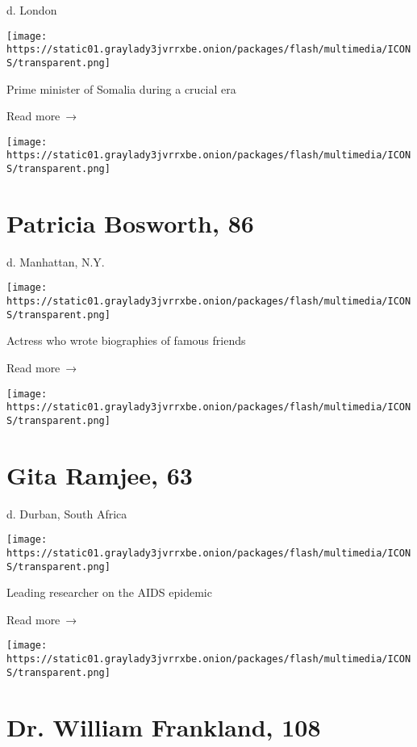 d. London

\texttt{[image: https://static01.graylady3jvrrxbe.onion/packages/flash/multimedia/ICONS/transparent.png]}

Prime minister of Somalia during a crucial era

 Read more~→

\href{https://www.nytimes3xbfgragh.onion/2020/04/03/books/patricia-bosworth-dead-virus.html}{}

\texttt{[image: https://static01.graylady3jvrrxbe.onion/packages/flash/multimedia/ICONS/transparent.png]}

\hypertarget{patricia-bosworth-86}{%
\section{Patricia Bosworth, 86}\label{patricia-bosworth-86}}

d. Manhattan, N.Y.

\texttt{[image: https://static01.graylady3jvrrxbe.onion/packages/flash/multimedia/ICONS/transparent.png]}

Actress who wrote biographies of famous friends

 Read more~→

\href{https://www.nytimes3xbfgragh.onion/2020/04/03/obituaries/gita-ramjee-dead-coronavirus.html}{}

\texttt{[image: https://static01.graylady3jvrrxbe.onion/packages/flash/multimedia/ICONS/transparent.png]}

\hypertarget{gita-ramjee-63}{%
\section{Gita Ramjee, 63}\label{gita-ramjee-63}}

d. Durban, South Africa

\texttt{[image: https://static01.graylady3jvrrxbe.onion/packages/flash/multimedia/ICONS/transparent.png]}

Leading researcher on the AIDS epidemic

 Read more~→

\href{https://www.nytimes3xbfgragh.onion/2020/04/03/science/william-frankland-dead-coronavirus.html}{}

\texttt{[image: https://static01.graylady3jvrrxbe.onion/packages/flash/multimedia/ICONS/transparent.png]}

\hypertarget{dr-william-frankland-108}{%
\section{Dr. William Frankland, 108}\label{dr-william-frankland-108}}

